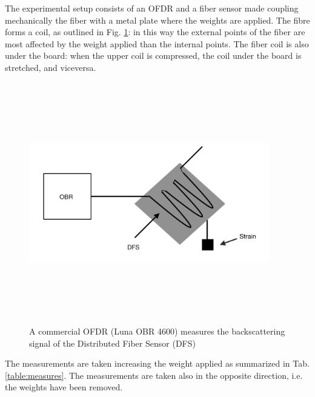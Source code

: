 The experimental setup consists of an OFDR and a fiber sensor made coupling mechanically the fiber with a metal plate where the weights are applied. The fibre forms a coil, as outlined in Fig. \ref{fig:setup}: in this way the external points of the fiber are most affected by the weight applied than the internal points. The fiber coil is also under the board: when the upper coil is compressed, the coil under the board is stretched, and viceversa.
\begin{figure}[H]
	\centering
	\includegraphics[height=10.5cm, width=10.5cm, keepaspectratio]{img/setup.png}
	\caption{A commercial OFDR (Luna OBR 4600) measures the backscattering signal of the Distributed Fiber Sensor (DFS)}\label{fig:setup}
\end{figure}
The measurements are taken increasing the weight applied as summarized in Tab.\ref{table:measures}. The measurements are taken also in the opposite direction, i.e. the weights have been removed.
